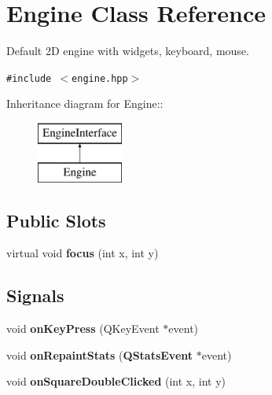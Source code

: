 \section{Engine Class Reference}
\label{classEngine}
Default 2D engine with widgets, keyboard, mouse.  


{\tt \#include $<$engine.hpp$>$}

Inheritance diagram for Engine::\begin{figure}[H]
\begin{center}
\leavevmode
\includegraphics[height=2cm]{classEngine}
\end{center}
\end{figure}
\subsection*{Public Slots}
\begin{CompactItemize}
\item 
virtual void {\bf focus} (int x, int y)
\end{CompactItemize}
\subsection*{Signals}
\begin{CompactItemize}
\item 
void {\bf on\-Key\-Press} (QKey\-Event $\ast$event)
\item 
void {\bf on\-Repaint\-Stats} ({\bf QStats\-Event} $\ast$event)
\item 
void {\bf on\-Square\-Double\-Clicked} (int x, int y)
\end{CompactItemize}
